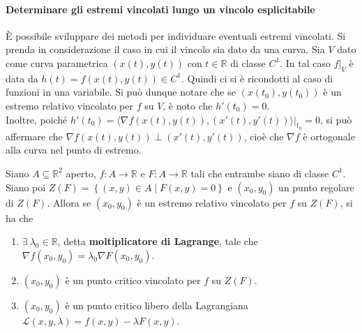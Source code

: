 \paragraph{Determinare gli estremi vincolati lungo un vincolo esplicitabile}
È possibile sviluppare dei metodi per individuare eventuali estremi vincolati. Si prenda in considerazione il caso in cui il vincolo sia dato da una curva.
Sia $V$ dato come curva parametrica $(x(t), y(t))$ con $t \in \mathbb{R}$ di classe $C^1$.
In tal caso $f \big|_V$ è data da $h(t)=f(x(t), y(t)) \in C^1$. Quindi ci si è ricondotti al caso di funzioni in una variabile. Si può dunque notare che se $(x(t_0), y(t_0))$ è un estremo relativo vincolato per $f$ su $V$, è noto che $h'(t_0)=0$.\\
Inoltre, poiché $h'(t_0)= \langle \nabla f(x(t), y(t)), (x'(t), y'(t)) \rangle \big|_{t_0}=0$, si può affermare che $\nabla f(x(t), y(t)) \perp (x'(t), y'(t))$, cioè che $\nabla f$ è ortogonale alla curva nel punto di estremo.
\begin{theorem} \label{Teo: Moltiplicatore di Lagrange}
Siano $A \subseteq \mathbb{R}^2$ aperto, $f: A \to \mathbb{R}$ e $F: A \to \mathbb{R}$ tali che entrambe siano di classe $C^1$. Siano poi $Z(F)= \left\{ (x,y) \in A \mid F(x,y)=0\right\}$ e $(x_0,y_0)$ un punto regolare di $Z(F)$. Allora se $(x_0, y_0)$ è un estremo relativo vincolato per $f$ su $Z(F)$, si ha che
\begin{enumerate}
    \item  $\exists\ \lambda_0 \in \mathbb{R}$, detta \textbf{moltiplicatore di Lagrange}, tale che $\nabla f(x_0, y_0)= \lambda_0 \nabla F(x_0, y_0)$.
    \item $(x_0, y_0)$ è un punto critico vincolato per $f$ su $Z(F)$.
    \item $(x_0, y_0)$ è un punto critico libero della Lagrangiana $\mathcal{L}(x, y, \lambda)=f(x,y)- \lambda F(x, y)$.
\end{enumerate}
\end{theorem}
